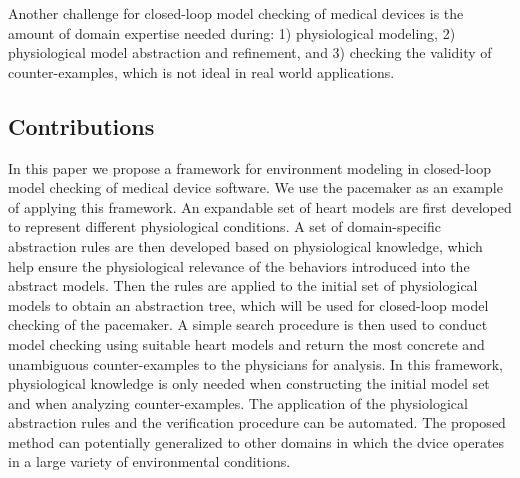Another challenge for closed-loop model checking of medical devices is the amount of domain expertise needed during: 1) physiological modeling, 2) physiological model abstraction and refinement, and 3) checking the validity of counter-examples, which is not ideal in real world applications. 




\subsection{Contributions}
In this paper we propose a framework for environment modeling in closed-loop model checking of medical device software.
We use the pacemaker as an example of applying this framework.
An expandable set of heart models are first developed to represent different physiological conditions. 
A set of domain-specific abstraction rules are then developed based on physiological knowledge, which help ensure the physiological relevance of the behaviors introduced into the abstract models. 
Then the rules are applied to the initial set of physiological models to obtain an abstraction tree, which will be used for closed-loop model checking of the pacemaker. 
A simple search procedure is then used to conduct model checking using suitable heart models and return the most concrete and unambiguous counter-examples to the physicians for analysis. 
In this framework, physiological knowledge is only needed when constructing the initial model set and when analyzing counter-examples. 
The application of the physiological abstraction rules and the verification procedure can be automated.
The proposed method can potentially generalized to other domains in which the dvice operates in a large variety of environmental conditions.
